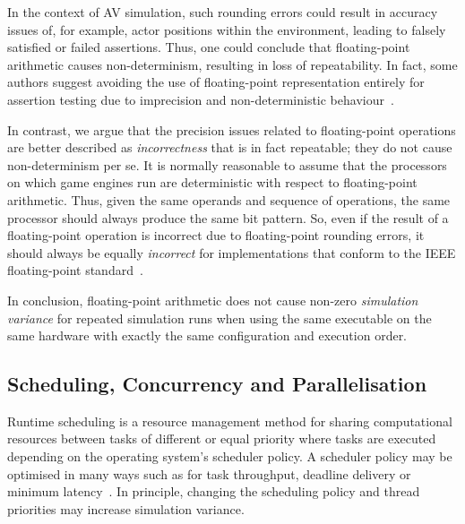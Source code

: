 In the context of AV simulation, such rounding errors could result in accuracy issues of, for example, actor positions within the environment, leading to falsely satisfied or failed assertions.
%
Thus, one could conclude that floating-point arithmetic causes non-determinism, resulting in loss of repeatability. In fact, some authors suggest avoiding the use of floating-point representation entirely for assertion testing due to imprecision and non-deterministic behaviour~\cite{empirical-analysis-of-flaky-tests}. 

In contrast, we argue that the precision issues related to floating-point operations are better described as \textit{incorrectness} that is in fact repeatable; they do not cause non-determinism per se. 
%
It is normally reasonable to assume that the processors on which game engines run are deterministic with respect to floating-point arithmetic. 
%
Thus, given the same operands and sequence of operations, the same processor should always produce the same bit pattern. 
%
So, even if the result of a floating-point operation is incorrect due to floating-point rounding errors, it should always be equally \textit{incorrect} for implementations that conform to the IEEE floating-point standard~\cite{8766229}.

 

In conclusion, floating-point arithmetic does not cause non-zero \textit{simulation variance} for repeated simulation runs when using the same executable on the same hardware with exactly the same configuration and execution order.




\subsection{Scheduling, Concurrency and Parallelisation}
Runtime scheduling is a resource management method for sharing computational resources between tasks of different or equal priority where tasks are executed depending on the operating system's scheduler policy. A scheduler policy may be optimised in many ways such as for task throughput, deadline delivery or minimum latency~\cite{liu1973scheduling}. 
%
In principle, changing the scheduling policy and thread priorities may increase simulation variance. 

